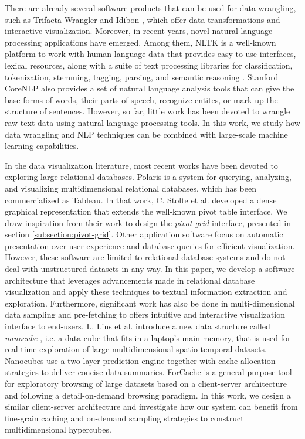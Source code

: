 \documentclass[10pt, a4paper, twocolumn]{article} %
\begin{document}
There are already several software products that can be used for data wrangling, such as Trifacta Wrangler \cite{wrangler, trifacta} and Idibon \cite{muck, mitext}, which offer data transformations and interactive visualization.
Moreover, in recent years, novel natural language processing applications have emerged. Among them, NLTK is a well-known platform to work with human language data that provides easy-to-use interfaces, lexical resources, along with a suite of text processing libraries for classification, tokenization, stemming, tagging, parsing, and semantic reasoning \cite{nltk}.
Stanford CoreNLP \cite{core-nlp} also provides a set of natural language analysis tools that can give the base forms of words, their parts of speech, recognize entites, or mark up the structure of sentences. 
However, so far, little work has been devoted to wrangle raw text data using natural language processing tools. In this work, we study how data wrangling and NLP techniques can be combined with large-scale machine learning capabilities.

In the data visualization literature, most recent works have been devoted to exploring large relational databases. 
Polaris \cite{polaris} is a system for querying, analyzing, and visualizing multidimensional relational databases, which has been commercialized as Tableau. In that work, C. Stolte et al. developed a dense graphical representation that extends the well-known pivot table interface. We draw inspiration from their work to design the \textit{pivot grid} interface, presented in section \ref{subsection:pivot-grid}.
Other application software focus on automatic presentation over user experience \cite{show-me} and database queries for efficient visualization\cite{seedb}.
However, these software are limited to relational database systems and do not deal with unstructured datasets in any way. In this paper, we develop a software architecture that leverages advancements made in relational database visualization and apply these techniques to textual information extraction and exploration.
Furthermore, significant work has also be done in multi-dimensional data sampling and pre-fetching to offers intuitive and interactive visualization interface to end-users.
L. Lins et al. introduce a new data structure called \textit{nanocube} \cite{nanocubes}, i.e. a data cube that fits in a laptop's main memory, that is used for real-time exploration of large multidimensional spatio-temporal datasets. Nanocubes use a two-layer prediction engine together with cache allocation strategies to deliver concise data summaries.
ForCache \cite{data-tiles} is a general-purpose tool for exploratory browsing of large datasets based on a client-server architecture and following a detail-on-demand browsing paradigm.
In this work, we design a similar client-server architecture and investigate how our system can benefit from fine-grain caching and on-demand sampling strategies to construct multidimensional hypercubes. 
\end{document}
